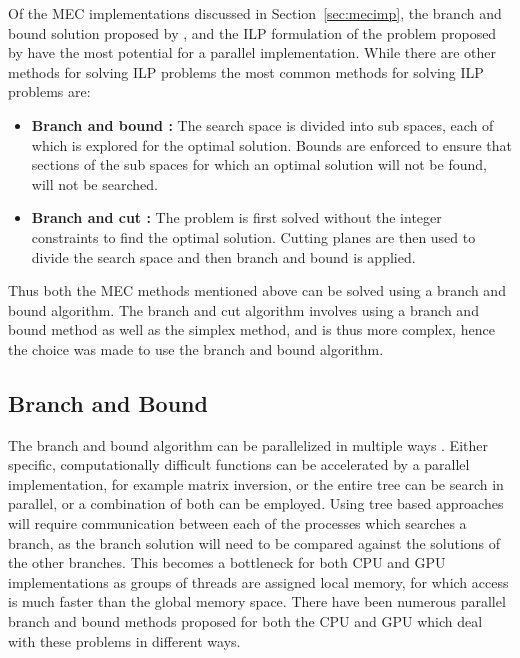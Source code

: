 \documentclass[10pt,twocolumn]{witseiepaper}
\begin{document}
Of the MEC implementations discussed in Section~\ref{sec:mecimp}, the branch and bound solution proposed by
\cite{wang:2005}, and the ILP formulation of the problem proposed by \cite{chen:2013} have the most potential 
for a parallel implementation. While there are other methods for solving ILP problems \cite{galli:2014} the 
most common methods for solving ILP problems are:
\begin{itemize}
\item{ \textbf{Branch and bound :} The search space is divided into sub spaces, each of which is explored
        for the optimal solution. Bounds are enforced to ensure that sections of the sub spaces for which
    an optimal solution will not be found, will not be searched.
}
\item{ \textbf{Branch and cut :} The problem is first solved without the integer constraints to find the
    optimal solution. Cutting planes are then used to divide the search space and then branch and bound is
    applied.
}        
\end{itemize}
Thus both the MEC methods mentioned above can be solved using a branch and bound algorithm. The branch and cut
algorithm involves using a branch and bound method as well as the simplex method, and is thus more complex,
hence the choice was made to use the branch and bound algorithm. 


\subsection{Branch and Bound} \label{sec:bnb}

The branch and bound algorithm can be parallelized in multiple ways \cite{crainic:2006}. Either specific,
computationally difficult functions can be accelerated by a parallel implementation, for example matrix
inversion, or the entire tree can be search in parallel, or a combination of both can be employed. Using tree
based approaches will require communication between each of the processes which searches a branch, as the
branch solution will need to be compared against the solutions of the other branches. This becomes a
bottleneck for both CPU and GPU implementations as groups of threads are assigned local memory, for which
access is much faster than the global memory space. There have been numerous parallel branch and bound methods
proposed for both the CPU and GPU which deal with these problems in different ways.
\end{document}
